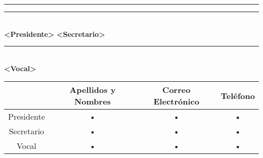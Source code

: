 	\vspace{1.2cm}
	\begin{flushleft}
	\hspace{1cm} \rule{60mm}{0.2mm} \hspace{2.25cm} \rule{50mm}{0.2mm}\\
	\hspace{2.3cm} \large{\textbf{<Presidente>}} \hspace{4.45cm} \large{\textbf{<Secretario>}}\\ 
	\end{flushleft}
	\vspace{1.15cm}
	\begin{center}
		\rule{60mm}{0.2mm}\\
		\large{\textbf{<Vocal>}}\\
		\end{center}
	\vspace{0.5cm}
\begin{center}
	\begin{tabular}{|c|c|c|c|}
	\hline 
	 & \large{Apellidos y Nombres} & \large{Correo Electrónico} & \large{Teléfono} \\ 
	\hline 
	\large{Presidente} & • & • & • \\ 
	\hline 
	\large{Secretario} & • & • & • \\ 
	\hline 
	\large{Vocal} & • & • & • \\ 
	\hline 
	\end{tabular} 
\end{center}
$\ $
\thispagestyle{empty} %